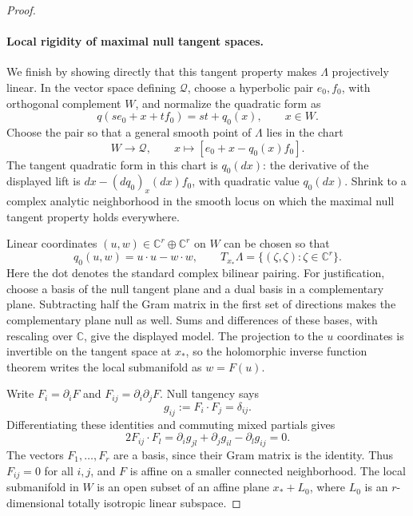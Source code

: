 \begin{proof}
\paragraph{Local rigidity of maximal null tangent spaces.}
We finish by showing directly that this tangent property makes
\(\Lambda\) projectively linear.  In the vector space defining
\(\mathcal Q\), choose a hyperbolic pair \(e_0,f_0\), with
orthogonal complement \(W\), and normalize the quadratic form as
\[
 q(se_0+x+tf_0)=st+q_0(x),\qquad x\in W.
\]
Choose the pair so that a general smooth point of \(\Lambda\)
lies in the chart
\begin{equation}
 W\longrightarrow\mathcal Q,
 \qquad x\longmapsto[e_0+x-q_0(x)f_0].
 \label{conc:deg-conformal-chart}
\end{equation}
The tangent quadratic form in this chart is \(q_0(dx)\):
the derivative of the displayed lift is
\(dx-(dq_0)_x(dx)f_0\), with quadratic value \(q_0(dx)\).
Shrink to a complex analytic neighborhood in the smooth locus
on which the maximal null tangent property holds everywhere.

Linear coordinates \((u,w)\in\mathbb{C}^r\oplus\mathbb{C}^r\)
on \(W\) can be chosen so that
\[
 q_0(u,w)=u\cdot u-w\cdot w,
 \qquad
 T_{x_*}\Lambda=\{(\zeta,\zeta):\zeta\in\mathbb{C}^r\}.
\]
Here the dot denotes the standard complex bilinear pairing.
For justification, choose a basis of the null tangent plane and
a dual basis in a complementary plane.  Subtracting half the
Gram matrix in the first set of directions makes the complementary
plane null as well.  Sums and differences of these bases, with
rescaling over \(\mathbb{C}\), give the displayed model.
The projection to the \(u\) coordinates is invertible on the
tangent space at \(x_*\), so the holomorphic inverse function
theorem writes the local submanifold as \(w=F(u)\).

Write \(F_i=\partial_iF\) and \(F_{ij}=\partial_i\partial_jF\).
Null tangency says
\[
 g_{ij}:=F_i\cdot F_j=\delta_{ij}.
\]
Differentiating these identities and commuting mixed partials gives
\[
 2F_{ij}\cdot F_l
   =\partial_i g_{jl}+\partial_j g_{il}-\partial_l g_{ij}=0.
\]
The vectors \(F_1,\ldots,F_r\) are a basis, since their Gram
matrix is the identity.  Thus \(F_{ij}=0\) for all \(i,j\),
and \(F\) is affine on a smaller connected neighborhood.
The local submanifold in \(W\) is an open subset of an affine
plane \(x_*+L_0\), where \(L_0\) is an \(r\)-dimensional
totally isotropic linear subspace.


\end{proof}
